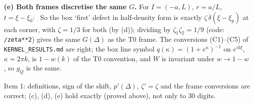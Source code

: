 \documentclass[11pt]{article}
\begin{document}
\textbf{(e) Both frames discretise the same $G$.} For $I=(-a,L)$, $r=a/L$, $t=\xi-\xi_0$:
\ So the box `first' defect in half-density form is exactly $\zeta\,\dot\delta(\xi-\xi_p)$ at each corner, with
$\zeta=1/3$ for both (by (d)); dividing by $\zeta_1\zeta_2=1/9$ (code: \texttt{/zeta**2}) gives the same $G(\Delta)$ as the
T0 frame. The conversions (C1)--(C5) of \texttt{KERNEL\_RESULTS.md} are right; the box line symbol
$q(\kappa)=(1+e^{\kappa})^{-1}$ on $e^{ik\xi}$, $\kappa=2\pi k$, is $1-w(k)$ of the T0 convention, and $W$ is invariant under
$w\to1-w$, so $g_Q$ is the same.
\begin{verdictok}
Item 1: definitions, sign of the shift, $p'(\Delta)$, $\zeta'=\zeta$ and the frame conversions are correct; (c), (d), (e)
hold exactly (proved above), not only to 30 digits.
\end{verdictok}
\end{document}
